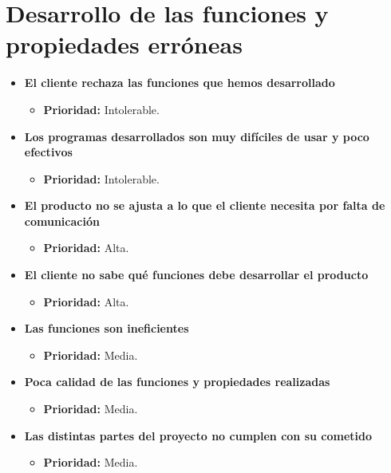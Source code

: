 \documentclass[spanish,a4paper,12pt]{report}	%
\begin{document}
\section{Desarrollo de las funciones y propiedades erróneas}
	\begin{itemize}

		\item \textbf{El cliente rechaza las funciones que hemos desarrollado}
			\begin{itemize}
				\item \textbf{Prioridad: }Intolerable.
			\end{itemize}

		\item \textbf{Los programas desarrollados son muy difíciles de usar y poco efectivos}	
			\begin{itemize}
				\item \textbf{Prioridad: }Intolerable.
			\end{itemize}

		\item \textbf{El producto no se ajusta a lo que el cliente necesita por falta de comunicación}%
			\begin{itemize}
				\item \textbf{Prioridad: }Alta.
			\end{itemize}
			
		\item \textbf{El cliente no sabe qué funciones debe desarrollar el producto}%
			\begin{itemize}
				\item \textbf{Prioridad: }Alta.
			\end{itemize}
		
		\item \textbf{Las funciones son ineficientes}
			\begin{itemize}
				\item \textbf{Prioridad: }Media.
			\end{itemize}
		
		\item \textbf{Poca calidad de las funciones y propiedades realizadas}
			\begin{itemize}
				\item \textbf{Prioridad: }Media.
			\end{itemize}
		
		\item \textbf{Las distintas partes del proyecto no cumplen con su cometido}
			\begin{itemize}
				\item \textbf{Prioridad: }Media.
			\end{itemize}
		

\end{itemize}
\end{document}
